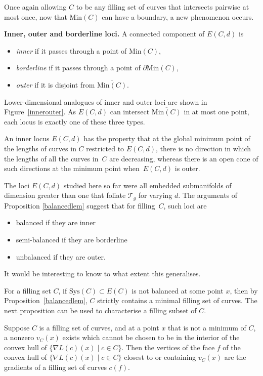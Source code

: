 Once again allowing $C$ to be any filling set of curves that intersects pairwise at most once, now that $\mathrm{Min}(C)$ can have a boundary, a new phenomenon occurs.

\textbf{Inner, outer and borderline loci.} A connected component of $E(C,d)$ is
\begin{itemize}\itemsep=0pt
\item\textit{inner} if it passes through a point of $\mathrm{Min}(C)$,
\item\textit{borderline} if it passes through a point of $\partial \mathrm{Min}(C)$,
\item\textit{outer} if it is disjoint from $\overline{\mathrm{Min}(C)}$.
\end{itemize}
Lower-dimensional analogues of inner and outer loci are shown in Figure~\ref{innerouter}. As $E(C,d)$ can intersect $\overline{\mathrm{Min}(C)}$ in at most one point, each locus is exactly one of these three types.

An inner locus $E(C, d)$ has the property that at the global minimum point of the lengths of curves in $C$ restricted to $E(C, d)$, there is no direction in which the lengths of all the curves in~$C$ are decreasing, whereas there is an open cone of such directions at the minimum point when~$E(C, d)$ is outer.

The loci $E(C,d)$ studied here so far were all embedded submanifolds of dimension greater than one that foliate $\mathcal{T}_{g}$ for varying $d$. The arguments of Proposition \ref{balancedlem} suggest that for filling~$C$, such loci are
\begin{itemize}\itemsep=0pt
\item balanced if they are inner
\item semi-balanced if they are borderline
\item unbalanced if they are outer.
\end{itemize}
It would be interesting to know to what extent this generalises.

For a filling set $C$, if $\mathrm{Sys}(C)\subset E(C)$ is not balanced at some point $x$, then by Proposition~\ref{balancedlem}, $C$ strictly contains a minimal filling set of curves. The next proposition can be used to characterise a filling subset of $C$.

\begin{Proposition}
\label{plus1}
Suppose $C$ is a filling set of curves, and at a point $x$ that is not a minimum of $C$, a nonzero $v_{C}(x)$ exists which cannot be chosen to be in the interior of the convex hull of $\{\nabla L(c)(x) \mid c\in C\}$. Then the vertices of the face $f$ of the convex hull of $\{\nabla L(c)(x) \mid c\in C\}$ closest to or containing $v_{C}(x)$ are the gradients of a filling set of curves $c(f)$.
\end{Proposition}


